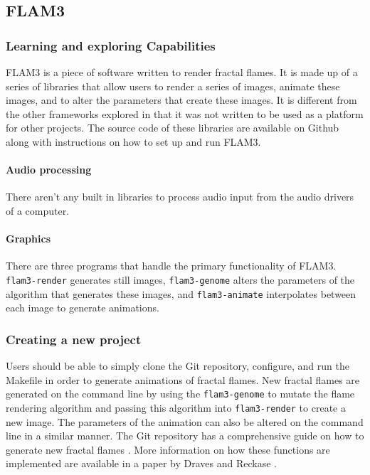 \documentclass[../../initial_thesis.tex]{subfiles}
\begin{document}
\subsection{FLAM3}

\subsubsection{Learning and exploring Capabilities}
FLAM3 is a piece of software written to render fractal flames. It is made up of a series of libraries that allow users to render a series of images, animate these images, and to alter the parameters that create these images. It is different from the other frameworks explored in that it was not written to be used as a platform for other projects. The source code of these libraries are available on Github along with instructions on how to set up and run FLAM3.

\paragraph{Audio processing}
There aren't any built in libraries to process audio input from the audio drivers of a computer.
\paragraph{Graphics}
There are three programs that handle the primary functionality of FLAM3. \verb|flam3-render| generates still images, \verb|flam3-genome| alters the parameters of the algorithm that generates these images, and \verb|flam3-animate| interpolates between each image to generate animations.

\subsubsection{Creating a new project}
Users should be able to simply clone the Git repository, configure, and run the Makefile in order to generate animations of fractal flames. New fractal flames are generated on the command line by using the \verb|flam3-genome| to mutate the flame rendering algorithm and passing this algorithm into \verb|flam3-render| to create a new image. The parameters of the animation can also be altered on the command line in a similar manner. The Git repository has a comprehensive guide on how to generate new fractal flames \cite{Draves}. More information on how these functions are implemented are available in a paper by Draves and Reckase \cite{Draves2003}.
\end{document}
